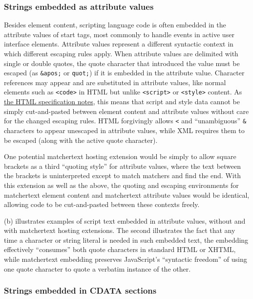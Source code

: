 \subsubsection{Strings embedded as attribute values}

Besides element content,
scripting language code is often embedded in the attribute values
of \ml start tags,
most commonly to handle events in active user interface elements.
Attribute values represent a different syntactic context
in which different escaping rules apply.
When attribute values are delimited with single or double quotes,
the quote character that introduced the value must be escaped
(as \verb|&apos;| or \verb|quot;|)
if it is embedded in the attribute value.
Character references may appear and are substituted in attribute values,
like normal elements such as \verb|<code>| in HTML
but unlike \verb|<script>| or \verb|<style>| content.
As \href{https://www.w3.org/TR/html401/appendix/notes.html#notes-specifying-data}{the HTML specification notes},
this means that script and style data cannot be simply
cut-and-pasted between element content and attribute values
without care for the changed escaping rules.
HTML forgivingly allows \verb|<| and ``unambiguous'' \verb|&| characters
to appear unescaped in attribute values,
while XML requires them to be escaped (along with the active quote character).

One potential matchertext hosting extension
would be simply to allow square brackets as a third ``quoting style''
for attribute values,
where the text between the brackets is uninterpreted
except to match matchers and find the end.
With this extension as well as the above,
the quoting and escaping environments for matchertext element content
and matchertext attribute values would be identical,
allowing code to be cut-and-pasted between these contexts freely.

(b) illustrates examples
of script text embedded in attribute values,
without and with matchertext hosting extensions.
The second illustrates the fact that any time
a character or string literal is needed in such embedded text,
the embedding effectively ``consumes'' both quote characters
in standard HTML or XHTML,
while matchertext embedding preserves JavaScript's ``syntactic freedom''
of using one quote character to quote a verbatim instance of the other.


\subsubsection{Strings embedded in CDATA sections}

